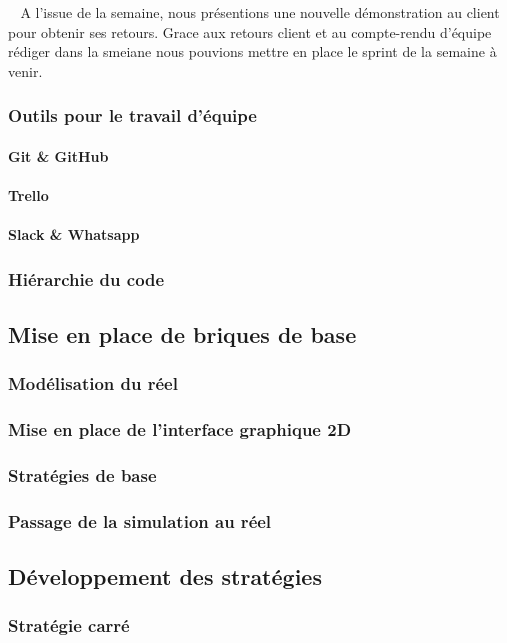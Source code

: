\documentclass[12pt]{article}
\def\tab{$\>\>\>\>$}
\begin{document}
\tab A l'issue de la semaine, nous présentions une nouvelle démonstration au client pour obtenir ses retours. Grace aux retours client et au compte-rendu d'équipe rédiger dans la smeiane nous pouvions mettre en place le sprint de la semaine à venir.

\subsubsection{Outils pour le travail d'équipe}
\paragraph{Git \& GitHub}
\paragraph{Trello}
\paragraph{Slack \& Whatsapp}
\subsubsection{Hiérarchie du code}

\newpage
\subsection{Mise en place de briques de base}
\subsubsection{Modélisation du réel}
\subsubsection{Mise en place de l'interface graphique 2D}
\subsubsection{Stratégies de base}
\subsubsection{Passage de la simulation au réel}

\newpage
\subsection{Développement des stratégies}
\subsubsection{Stratégie carré}
\end{document}

